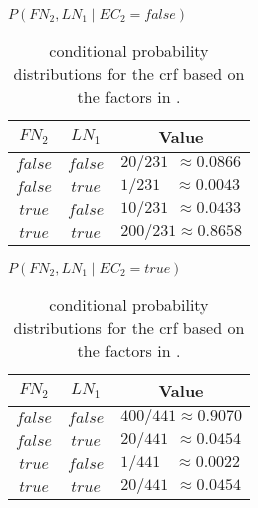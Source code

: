 \begin{table}[h!]
\begin{minipage}{0.5\linewidth}
\centering
$P(FN_2,LN_1 \mid EC_2{=}false)$\par
\smallskip
\begin{tabular}{c c l}
 \toprule
  $FN_2$ & $LN_1$ & \multicolumn{1}{c}{Value} \\
 \midrule
 $false$ & $false$&$20/231\ \ \approx0.0866$\\
 $false$ & $true$ &$1/231\ \ \ \ \approx0.0043$\\
 $true$ & $false$ &$10/231\ \ \approx0.0433$\\
 $true$ & $true$ & $200/231\approx0.8658$\\
 \bottomrule
\end{tabular}
\end{minipage}
\hfill
\begin{minipage}{0.5\linewidth}
\centering
$P(FN_2,LN_1 \mid EC_2{=}true)$\par
\smallskip
\begin{tabular}{c c l}
 \toprule
 $FN_2$ & $LN_1$ & \multicolumn{1}{c}{Value} \\
 \midrule
 $false$ & $false$ &$400/441\approx0.9070$\\
 $false$ & $true$ & $20/441\ \ \approx0.0454$\\
 $true$ & $false$ & $1/441\ \ \ \ \approx0.0022$\\
 $true$ & $true$ &  $20/441\ \ \approx0.0454$\\
 \bottomrule
\end{tabular}
\end{minipage}
\caption{\Glspl{conditional probability distribution} for the \gls{crf} based on the \glspl{factor} in .}
\label{tab:example-crf-cpds}
\end{table}
